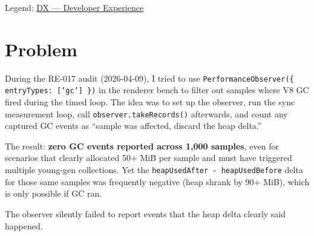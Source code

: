 Legend: \href{https://github.com/flyingrobots/bijou/blob/1853ad902f6bf219326409e7f743a5a1d6517dbc/docs/method/legends/DX-developer-experience.md}{DX --- Developer Experience}

\section{Problem}\label{record-310-problem}

During the RE-017 audit (2026-04-09), I tried to use \texttt{P\allowbreak{}e\allowbreak{}r\allowbreak{}f\allowbreak{}o\allowbreak{}r\allowbreak{}m\allowbreak{}a\allowbreak{}n\allowbreak{}c\allowbreak{}e\allowbreak{}O\allowbreak{}b\allowbreak{}s\allowbreak{}e\allowbreak{}r\allowbreak{}v\allowbreak{}e\allowbreak{}r\allowbreak{}(\allowbreak{}\{\allowbreak{} \allowbreak{}e\allowbreak{}n\allowbreak{}t\allowbreak{}r\allowbreak{}y\allowbreak{}T\allowbreak{}y\allowbreak{}p\allowbreak{}e\allowbreak{}s\allowbreak{}:\allowbreak{} \allowbreak{}[\allowbreak{}'\allowbreak{}g\allowbreak{}c\allowbreak{}'\allowbreak{}]\allowbreak{} \allowbreak{}\}\allowbreak{})} in the renderer bench to filter out samples where V8 GC fired during the timed loop. The idea was to set up the observer, run the sync measurement loop, call \texttt{o\allowbreak{}b\allowbreak{}s\allowbreak{}e\allowbreak{}r\allowbreak{}v\allowbreak{}e\allowbreak{}r\allowbreak{}.\allowbreak{}t\allowbreak{}a\allowbreak{}k\allowbreak{}e\allowbreak{}R\allowbreak{}e\allowbreak{}c\allowbreak{}o\allowbreak{}r\allowbreak{}d\allowbreak{}s\allowbreak{}(\allowbreak{})} afterwards, and count any captured GC events as ``sample was affected, discard the heap delta.''

The result: \textbf{zero GC events reported across 1,000 samples}, even for scenarios that clearly allocated 50+ MiB per sample and must have triggered multiple young-gen collections. Yet the \texttt{h\allowbreak{}e\allowbreak{}a\allowbreak{}p\allowbreak{}U\allowbreak{}s\allowbreak{}e\allowbreak{}d\allowbreak{}A\allowbreak{}f\allowbreak{}t\allowbreak{}e\allowbreak{}r\allowbreak{} \allowbreak{}-\allowbreak{} \allowbreak{}h\allowbreak{}e\allowbreak{}a\allowbreak{}p\allowbreak{}U\allowbreak{}s\allowbreak{}e\allowbreak{}d\allowbreak{}B\allowbreak{}e\allowbreak{}f\allowbreak{}o\allowbreak{}r\allowbreak{}e} delta for those same samples was frequently negative (heap shrank by 90+ MiB), which is only possible if GC ran.

The observer silently failed to report events that the heap delta clearly said happened.

